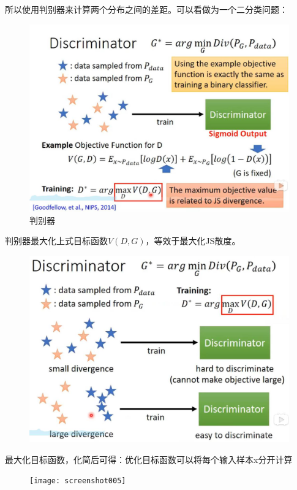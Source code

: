 \documentclass[UTF8]{ctexart} %
\begin{document}
	所以使用判别器来计算两个分布之间的差距。可以看做为一个二分类问题：
	\begin{figure}[H]
	\centering
	\includegraphics[scale=0.5]{screenshot002}
	\caption{判别器}
	\label{fig:screenshot002}
	\end{figure}
	判别器最大化上式目标函数$V(D,G)$，等效于最大化JS散度。
	\begin{figure}[H]
	\centering
	\caption{}
	\label{fig:screenshot003}
	\includegraphics[scale=0.5]{screenshot003}
	\end{figure}
	
	最大化目标函数，化简后可得：优化目标函数可以将每个输入样本x分开计算
	\begin{figure}[H]
	\centering
	\texttt{[image: screenshot005]}
	\caption{}
	\label{fig:screenshot005}
	\end{figure}
\end{document}
